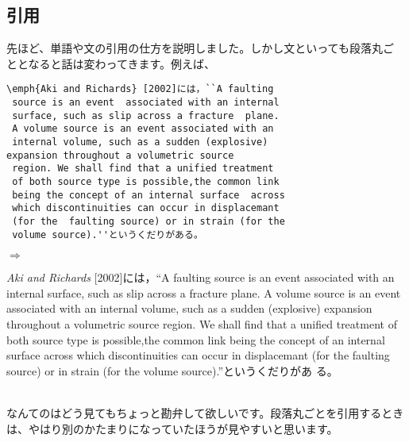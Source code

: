 \subsection{引用}
先ほど、単語や文の引用の仕方を説明しました。しかし文といっても段落丸ご
ととなると話は変わってきます。例えば、\\
\begin{minipage}[c]{.50\textwidth}
\begin{screen}
\small
\begin{verbatim}
\emph{Aki and Richards} [2002]には，``A faulting
 source is an event  associated with an internal
 surface, such as slip across a fracture  plane.
 A volume source is an event associated with an
 internal volume, such as a sudden (explosive)
expansion throughout a volumetric source
 region. We shall find that a unified treatment
 of both source type is possible,the common link
 being the concept of an internal surface  across
 which discontinuities can occur in displacemant
 (for the  faulting source) or in strain (for the
 volume source).''というくだりがある。
\end{verbatim}
\end{screen}
\end{minipage}%
$\Rightarrow$
\begin{minipage}{.45\textwidth}
\begin{shadebox}
\emph{Aki and Richards} [2002]には，``A faulting source is an event
 associated with an internal surface, such as slip across a fracture
 plane. A volume source is an event associated with an internal volume,
 such as a sudden (explosive) expansion throughout a volumetric source
 region. We shall find that a unified treatment of both source type is
 possible,the common link being the concept of an internal surface
 across which discontinuities can occur in displacemant (for the
 faulting source) or in strain (for the volume source).''というくだりがあ
 る。
\end{shadebox}
\end{minipage}
\vspace*{1mm}\\
なんてのはどう見てもちょっと勘弁して欲しいです。段落丸ごとを引用するとき
は、やはり別のかたまりになっていたほうが見やすいと思います。

